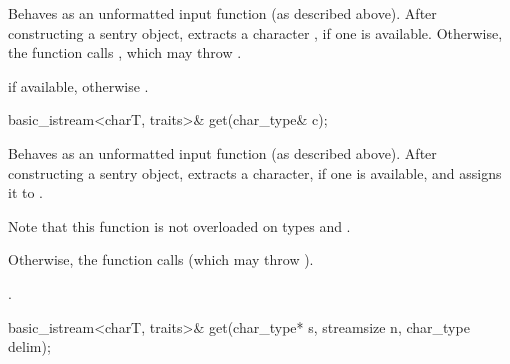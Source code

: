 \begin{itemdescr}
\pnum
\effects
Behaves as an unformatted input function
(as described above).
After constructing a sentry object, extracts
a character , if one is available.
Otherwise, the function calls
,
which may throw
.

\pnum
\returns
{} if available,
otherwise
.
\end{itemdescr}

%
\begin{itemdecl}
basic_istream<charT, traits>& get(char_type& c);
\end{itemdecl}

\begin{itemdescr}
\pnum
\effects
Behaves as an unformatted input function
(as described above).
After constructing a sentry object, extracts
a character, if one is available, and assigns it to .
\begin{footnote}
Note
that this function is not overloaded on types
and
.
\end{footnote}
Otherwise, the function calls
(which may throw
).

\pnum
\returns
{}.
\end{itemdescr}

%
\begin{itemdecl}
basic_istream<charT, traits>& get(char_type* s, streamsize n, char_type delim);
\end{itemdecl}


